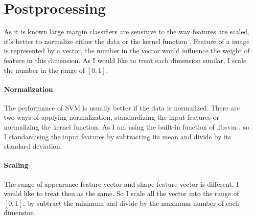 \section{Postprocessing}
As it is known large margin classifiers are sensitive to the way features are scaled, it's better to normalize either the data or the kernel function \cite{ben2010user}. Feature of a image is represented by a vector, the number in the vector would influence the weight of feature in this dimension. As I would like to treat each dimension similar, I scale the number in the range of $[0,1]$.
\paragraph{Normalization}
The performance of SVM is usually better if the data is normalized. There are two ways of applying normalization, standardizing the input features or normalizing the kernel function. As I am using the built-in function of libsvm \cite{CC01a}, so I standardising the input features by subtracting its mean and divide by its standard deviation.
\paragraph{Scaling}
The range of appearance feature vector and shape feature vector is different. I would like to treat then as the same. So I scale all the vector into the range of $[0, 1]$, by subtract the minimum and divide by the maximum number of each dimension.